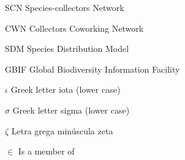\documentclass[
	12pt,				%
	openright,			%
	oneside,			%
	a4paper,			%
	sumario=tradicional,%
	french,				%
	spanish,			%
	brazil,				%
    english
	]{abntex2}
\begin{document}
%

%

\listoffigures*
\cleardoublepage

\listoftables*
\cleardoublepage

\begin{siglas}
  \item[SCN] Species-collectors Network
  \item[CWN] Collectors Coworking Network
  \item[SDM] Species Distribution Model
  \item[GBIF] Global Biodiversity Information Facility
  
\end{siglas}

\begin{simbolos}
  \item[$ \iota $] Greek letter iota (lower case)
  \item[$ \sigma $] Greek letter sigma (lower case)
  \item[$ \zeta $] Letra grega minúscula zeta
  \item[$ \in $] Is a member of
\end{simbolos}

\tableofcontents*
\cleardoublepage

\textual
\end{document}
